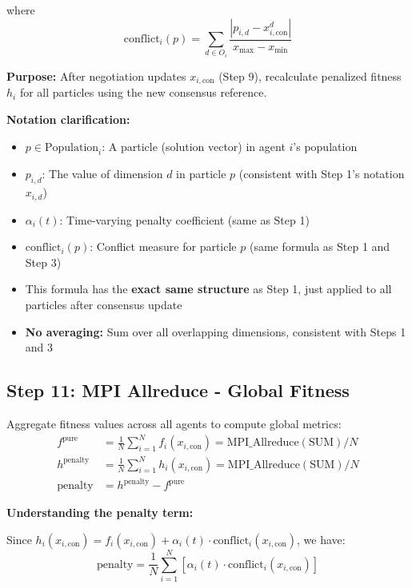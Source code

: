 \documentclass[11pt,a4paper]{article}
\begin{document}
where
\begin{equation}
\text{conflict}_i(p) = \sum_{d \in O_i} \frac{|p_{i,d} - x_{i,\text{con}}^d|}{x_{\max} - x_{\min}}
\end{equation}

\textbf{Purpose:} After negotiation updates $x_{i,\text{con}}$ (Step 9), recalculate penalized fitness $h_i$ for all particles using the new consensus reference.

\textbf{Notation clarification:}
\begin{itemize}
    \item $p \in \text{Population}_i$: A particle (solution vector) in agent $i$'s population
    \item $p_{i,d}$: The value of dimension $d$ in particle $p$ (consistent with Step 1's notation $x_{i,d}$)
    \item $\alpha_i(t)$: Time-varying penalty coefficient (same as Step 1)
    \item $\text{conflict}_i(p)$: Conflict measure for particle $p$ (same formula as Step 1 and Step 3)
    \item This formula has the \textbf{exact same structure} as Step 1, just applied to all particles after consensus update
    \item \textbf{No averaging:} Sum over all overlapping dimensions, consistent with Steps 1 and 3
\end{itemize}

\subsection{Step 11: MPI Allreduce - Global Fitness}
Aggregate fitness values across all agents to compute global metrics:
\begin{align}
f^{\text{pure}} &= \frac{1}{N}\sum_{i=1}^N f_i(x_{i,\text{con}}) = \text{MPI\_Allreduce}(\text{SUM}) / N \\
h^{\text{penalty}} &= \frac{1}{N}\sum_{i=1}^N h_i(x_{i,\text{con}}) = \text{MPI\_Allreduce}(\text{SUM}) / N \\
\text{penalty} &= h^{\text{penalty}} - f^{\text{pure}}
\end{align}

\textbf{Understanding the penalty term:}

Since $h_i(x_{i,\text{con}}) = f_i(x_{i,\text{con}}) + \alpha_i(t) \cdot \text{conflict}_i(x_{i,\text{con}})$, we have:
\begin{equation}
\text{penalty} = \frac{1}{N}\sum_{i=1}^N \left[\alpha_i(t) \cdot \text{conflict}_i(x_{i,\text{con}})\right]
\end{equation}
\end{document}
